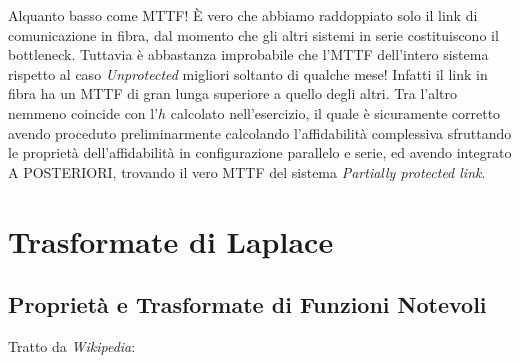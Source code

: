 Alquanto basso come MTTF! \`E vero che abbiamo raddoppiato solo il link di comunicazione in fibra, dal momento che gli altri sistemi in serie costituiscono il bottleneck. Tuttavia è abbastanza improbabile che l'MTTF dell'intero sistema rispetto al caso \textit{Unprotected} migliori soltanto di qualche mese! Infatti il link in fibra ha un MTTF di gran lunga superiore a quello degli altri. Tra l'altro nemmeno coincide con l'$h$ calcolato nell'esercizio, il quale è sicuramente corretto avendo proceduto preliminarmente calcolando l'affidabilità complessiva sfruttando le proprietà dell'affidabilità in configurazione parallelo e serie, ed avendo integrato A POSTERIORI, trovando il vero MTTF del sistema \textit{Partially protected link}.


\section{Trasformate di Laplace}

\subsection{Proprietà e Trasformate di Funzioni Notevoli}

Tratto da \textit{Wikipedia}:

